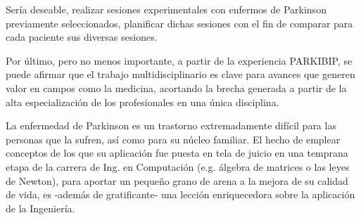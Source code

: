 Sería deseable, realizar sesiones experimentales con enfermos de Parkinson previamente seleccionados, planificar dichas sesiones con el fin de comparar para cada paciente sus diversas sesiones.


Por último, pero no menos importante, a partir de la experiencia PARKIBIP, se puede afirmar que el trabajo multidisciplinario es clave para avances que generen valor en campos como la medicina, acortando la brecha generada a partir de la alta especialización de los profesionales en una única disciplina. 


La enfermedad de Parkinson es un trastorno extremadamente difícil para las personas que la sufren, así como para su núcleo familiar. El hecho de emplear conceptos de los que su aplicación fue puesta en tela de juicio en una temprana etapa de la carrera de Ing. en Computación (e.g. álgebra de matrices o las leyes de Newton), para aportar un pequeño grano de arena a la mejora de su calidad de vida, es -además de gratificante- una lección enriquecedora sobre la aplicación de la Ingeniería. 